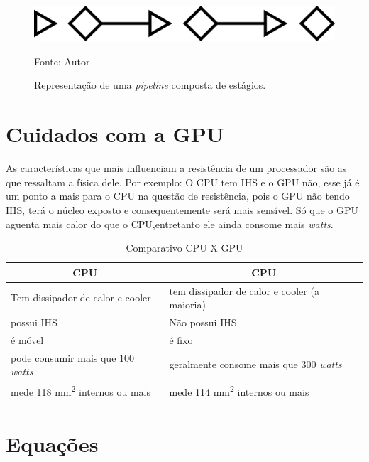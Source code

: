 \documentclass[12pt]{article}
\begin{document}
  \begin{figure}[ht]
    \centering
    \includegraphics[width=.5\textwidth]{img/pipeline.png}
    \caption{Representação de uma \textit{pipeline} composta de estágios.}
    Fonte: Autor
    \label{fig:pipeline}
  \end{figure}
  
  \section{Cuidados com a GPU}

  As características que mais influenciam a resistência de um processador são as que ressaltam a física dele.
  Por exemplo: O CPU tem IHS e o GPU não, esse já é um ponto a mais para o CPU na questão de resistência, 
  pois o GPU não tendo IHS, terá o núcleo exposto e consequentemente será mais sensível.
  Só que o GPU aguenta mais calor do que o CPU,entretanto ele ainda consome mais \textit{watts}.

  \begin{table}[h!]
    \centering
    \caption{Comparativo CPU X GPU}
    \label{comparativo}
    \begin{tabular}{|l|l|}
      \hline
      \multicolumn{1}{|c|}{\textbf{CPU}}              &   \multicolumn{1}{c|}{\textbf{CPU}}            \\ \hline
      Tem dissipador de calor e cooler                &   tem dissipador de calor e cooler (a maioria)  \\ \hline
      possui IHS                                      &   Não possui IHS                                 \\ \hline
      é móvel                                         &   é fixo                                          \\ \hline
      pode consumir mais que 100 \textit{watts}       &   geralmente consome mais que 300 \textit{watts}   \\ \hline
      mede 118 mm\textsuperscript{2} internos ou mais &   mede 114 mm\textsuperscript{2} internos ou mais   \\ \hline
    \end{tabular}
  \end{table}

  \section{Equações}
\end{document}

